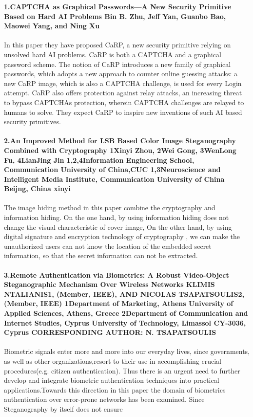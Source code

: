 \documentclass[12pt]{extreport}
\begin{document}
\textbf{1.CAPTCHA as Graphical Passwords—A New Security
Primitive Based on Hard AI Problems
Bin B. Zhu, Jeff Yan, Guanbo Bao, Maowei Yang, and Ning Xu}\\\\
In this paper they have proposed CaRP, a new security primitive relying on unsolved hard AI problems. CaRP is both a CAPTCHA and a graphical password scheme. The notion of CaRP introduces
a new family of graphical passwords, which adopts a new approach to counter online guessing attacks: a new CaRP image, which is also a CAPTCHA challenge, is used for every Login attempt.
CaRP also offers protection against relay attacks, an increasing threat to bypass CAPTCHAs protection, wherein CAPTCHA challenges are relayed to humans to solve. They expect CaRP to inspire new inventions of such AI based security primitives.\\\\
\textbf{2.An Improved Method for LSB Based Color Image
Steganography Combined with Cryptography
1Xinyi Zhou, 2Wei Gong, 3WenLong Fu, 4LianJing Jin
1,2,4Information Engineering School, Communication University of China,CUC 1,3Neuroscience and Intelligent Media Institute, Communication University of China Beijng, China xinyi }\\\\
The image hiding method in this paper combine the cryptography and information hiding. On the one hand, by using information hiding does not change the visual characteristic of cover image, On the other hand, by using digital signature and encryption technology of cryptography , we can make the unauthorized users can not
know the location of the embedded secret information, so that the secret information can not be extracted.\\\\
\textbf{3.Remote Authentication via Biometrics:
A Robust Video-Object Steganographic Mechanism Over Wireless Networks KLIMIS NTALIANIS1, (Member, IEEE), AND NICOLAS TSAPATSOULIS2, (Member, IEEE) 1Department of Marketing, Athens University of Applied Sciences, Athens, Greece 2Department of Communication and Internet Studies, Cyprus University of Technology, Limassol CY-3036, Cyprus CORRESPONDING AUTHOR: N. TSAPATSOULIS }\\\\
Biometric signals enter more and more into our everyday lives, since governments, as well as other organizations,resort to their use in accomplishing crucial procedures(e.g. citizen authentication). Thus there is an urgent need to further develop and integrate biometric authentication techniques into practical applications.Towards this direction in this paper the domain of biometrics authentication over error-prone networks has been examined. Since Steganography by itself does not ensure
\end{document}
